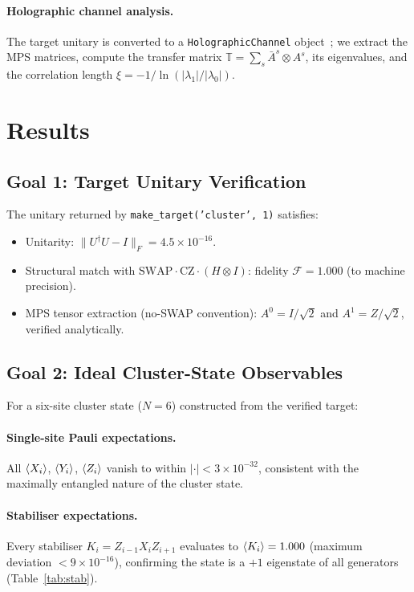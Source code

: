 \documentclass[aps,pra,twocolumn,reprint,floatfix,amsmath,amssymb]{revtex4-2}
\begin{document}
\paragraph{Holographic channel analysis.}
The target unitary is converted to a \texttt{HolographicChannel}
object~\cite{cqed_sim}; we extract the MPS matrices, compute
the transfer matrix
$\mathbb{T}=\sum_s \bar{A}^s\otimes A^s$,
its eigenvalues, and the correlation length
$\xi=-1/\ln(|\lambda_1|/|\lambda_0|)$.

\section{Results}\label{sec:results}

\subsection{Goal 1: Target Unitary Verification}

The unitary returned by \texttt{make\_target('cluster', 1)} satisfies:
\begin{itemize}
  \item Unitarity: $\|U^\dagger U - I\|_F = 4.5\times10^{-16}$.
  \item Structural match with
    $\mathrm{SWAP}\cdot\mathrm{CZ}\cdot(H\otimes I)$: fidelity
    $\mathcal{F}=1.000$ (to machine precision).
  \item MPS tensor extraction (no-SWAP convention): $A^0=I/\sqrt{2}$ and
    $A^1=Z/\sqrt{2}$, verified analytically.
\end{itemize}

\subsection{Goal 2: Ideal Cluster-State Observables}

For a six-site cluster state ($N=6$) constructed from the verified
target:

\paragraph{Single-site Pauli expectations.}
All $\braket{X_i}$, $\braket{Y_i}$, $\braket{Z_i}$ vanish to
within $|\cdot|<3\times10^{-32}$, consistent with the maximally
entangled nature of the cluster state.

\paragraph{Stabiliser expectations.}
Every stabiliser $K_i=Z_{i-1}X_iZ_{i+1}$ evaluates to
$\braket{K_i}=1.000$ (maximum deviation $<9\times10^{-16}$),
confirming the state is a $+1$ eigenstate of all generators
(Table~\ref{tab:stab}).
\end{document}
